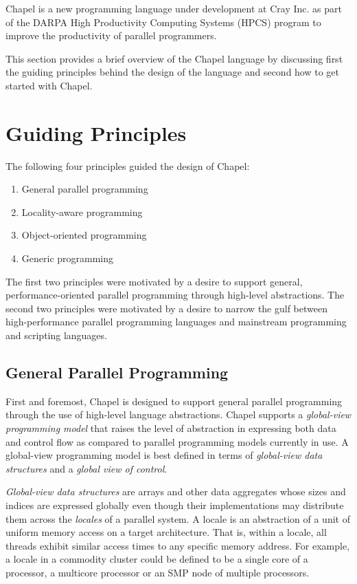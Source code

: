 \label{Language_Overview}

Chapel is a new programming language under development at Cray Inc. as
part of the DARPA High Productivity Computing Systems (HPCS) program
to improve the productivity of parallel programmers.

This section provides a brief overview of the Chapel language by
discussing first the guiding principles behind the design of the
language and second how to get started with Chapel.

\section{Guiding Principles}

The following four principles guided the design of Chapel:
\begin{enumerate}
\item General parallel programming
\item Locality-aware programming
\item Object-oriented programming
\item Generic programming
\end{enumerate}
The first two principles were motivated by a desire to support
general, performance-oriented parallel programming through high-level
abstractions.  The second two principles were motivated by a desire to
narrow the gulf between high-performance parallel programming
languages and mainstream programming and scripting languages.

\subsection{General Parallel Programming}

First and foremost, Chapel is designed to support general parallel
programming through the use of high-level language abstractions.
Chapel supports a \emph{global-view programming model} that raises the
level of abstraction in expressing both data and control flow as
compared to parallel programming models currently in use.
A global-view programming model is best defined in terms
of \emph{global-view data structures} and a \emph{global view of
control}.

\emph{Global-view data structures} are arrays and other data
aggregates whose sizes and indices are expressed globally even though
their implementations may distribute them across the \emph{locales} of
a parallel system.  A locale is an abstraction of a unit of uniform
memory access on a target architecture.  That is, within a locale, all
threads exhibit similar access times to any specific memory address.
For example, a locale in a commodity cluster could be defined to be a
single core of a processor, a multicore processor or an SMP node of
multiple processors.

